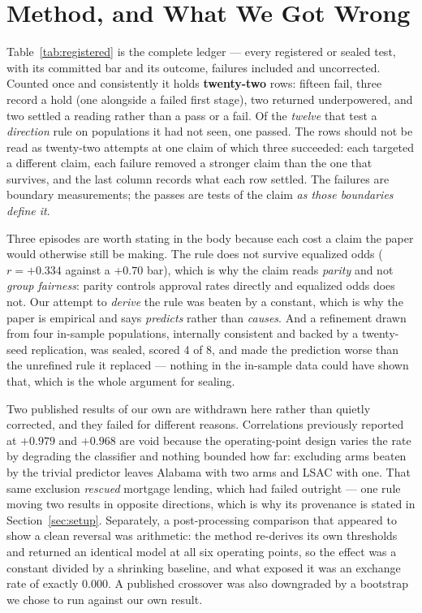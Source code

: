 \documentclass[conference]{IEEEtran}
\begin{document}
\section{Method, and What We Got Wrong}
\label{sec:failures}

Table~\ref{tab:registered} is the complete ledger --- every registered or sealed test, with its
committed bar and its outcome, failures included and uncorrected. Counted once and consistently it holds \textbf{twenty-two} rows: fifteen fail, three record a
hold (one alongside
a failed first stage), two returned underpowered, and two settled a reading rather than a pass
or a fail. Of the \emph{twelve} that test a \emph{direction} rule on populations it had not seen, one
passed. The rows should not be read as twenty-two attempts at one claim of which three
succeeded: each targeted a different claim, each failure removed a stronger claim than the one
that survives, and the last column records what each row settled. The failures are boundary
measurements; the passes are tests of the claim \emph{as those boundaries define it}.

Three episodes are worth stating in the body because each cost a claim the paper would
otherwise still be making. The rule does not survive equalized odds ($r = +0.334$ against a
$+0.70$ bar), which is why the claim reads \emph{parity} and not \emph{group fairness}: parity
controls approval rates directly and equalized odds does not. Our attempt to \emph{derive} the
rule was beaten by a constant, which is why the paper is empirical and says \emph{predicts}
rather than \emph{causes}. And a refinement drawn from four in-sample populations, internally
consistent and backed by a twenty-seed replication, was sealed, scored 4 of 8, and made the
prediction worse than the unrefined rule it replaced --- nothing in the in-sample data could
have shown that, which is the whole argument for sealing.

Two published results of our own are withdrawn here rather than quietly corrected, and they
failed for different reasons. Correlations previously reported at $+0.979$ and $+0.968$ are
void because the operating-point design varies the rate by degrading the classifier and
nothing bounded how far: excluding arms beaten by the trivial predictor leaves Alabama with
two arms and LSAC with one. That same exclusion \emph{rescued} mortgage lending, which had
failed outright --- one rule moving two results in opposite directions, which is why its
provenance is stated in Section~\ref{sec:setup}. Separately, a post-processing comparison that
appeared to show a clean reversal was arithmetic: the method re-derives its own thresholds and
returned an identical model at all six operating points, so the effect was a constant divided
by a shrinking baseline, and what exposed it was an exchange rate of exactly $0.000$. A published
crossover was also downgraded by a bootstrap we chose to run against our own result.
\end{document}
